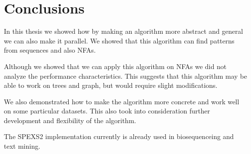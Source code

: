 
\chapter{Conclusions}


In this thesis we showed how by making an algorithm more abstract and
general we can also make it parallel. We showed that this algorithm
can find patterns from sequences and also NFAs.

Although we showed that we can apply this algorithm on NFAs we did
not analyze the performance characteristics. This suggests that this 
algorithm may be able to work on trees and graph, but would 
require slight modifications.

We also demonstrated how to make the algorithm more concrete 
and work well on some particular datasets. This also took into 
consideration further development and flexibility of the algorithm.

The SPEXS2 implementation currently is already used in biosequenceing
and text mining.

